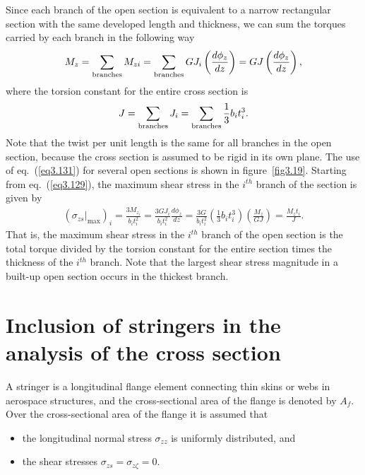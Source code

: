 \documentclass{AeroStructure-ERJohnson}
\begin{document}
Since each branch of the open section is equivalent to a narrow rectangular section with the same developed length and thickness, we can sum the torques carried by each branch in the following way
\begin{align}\label{eq3.130}
M_{z}=\sum_{{\rm branches }} M_{z i}=\sum_{{\rm branches }} G J_{i}\left(\frac{d \phi_{z}}{d z}\right)=G J\left(\frac{d \phi_{z}}{d z}\right),
\end{align}
where the torsion constant for the entire cross section is
\begin{align}\label{eq3.131}
J=\sum_{{\rm branches }} J_{i}=\sum_{{\rm branches }} \frac{1}{3} b_{i} t_{i}^{3}.
\end{align}
Note that the twist per unit length is the same for all branches in the open section, because the cross section is assumed to be rigid in its own plane. The use of eq.~(\ref{eq3.131}) for several open sections is shown in\vadjust{\pagebreak} figure~\ref{fig3.19}. Starting from eq.~(\ref{eq3.129}), the maximum shear stress in the $i^{th}$ branch of the section is given by
\begin{align}\label{eq3.132}
\left(\left.\sigma_{z s}\right|_{\max }\right)_{i}=\frac{3 M_{z_{i}}}{b_{i} t_{i}^{2}}=\frac{3 G J_{i}}{b_{i} t_{i}^{2}} \frac{d \phi_{z}}{d z}=\frac{3 G}{b_{i} t_{i}^{2}}\left(\frac{1}{3} b_{i} t_{i}^{3}\right)\left(\frac{M_{z}}{G J}\right)=\frac{M_{z} t_{i}}{J}.
\end{align}
That is, the maximum shear stress in the $i^{th}$ branch of the open section is the total torque divided by the torsion constant for the entire section times the thickness of the $i^{th}$ branch. Note that the largest shear stress magnitude in a built-up open section occurs in the thickest branch.

\section{Inclusion of stringers in the analysis of the cross section}\label{sec3.10}

A stringer is a longitudinal flange element connecting thin skins or webs in aerospace structures, and the cross-sectional area of the flange is denoted by $A_{f}$. Over the cross-sectional area of the flange it is assumed that
\begin{itemize}
\item the longitudinal normal stress $\sigma_{z z}$ is uniformly distributed, and

\item the shear stresses $\sigma_{z s}=\sigma_{z \zeta}=0$.\vspace*{-3pt}
\end{itemize}
\end{document}

